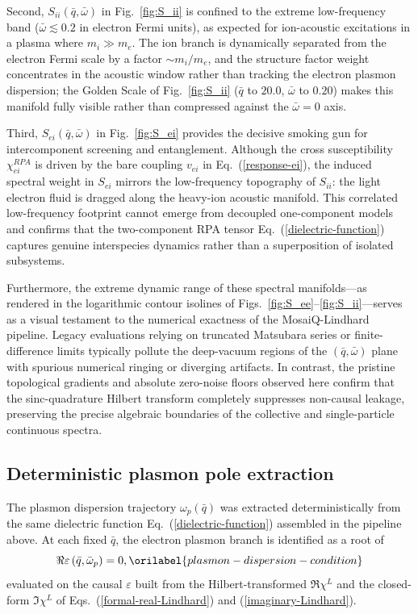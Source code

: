 \documentclass[aps,showkeys,noshowpacs,superscriptaddress,pre,preprint]{revtex4-2}
\let\label\orilabel
\begin{document}
Second, $S_{ii}(\bar{q}, \bar{\omega})$ in Fig.~\ref{fig:S_ii} is confined to the extreme low-frequency band ($\bar{\omega} \lesssim 0.2$ in electron Fermi units),
as expected for ion-acoustic excitations in a plasma where $m_i \gg m_e$.
The ion branch is dynamically separated from the electron Fermi scale by a factor $\sim m_i/m_e$,
and the structure factor weight concentrates in the acoustic window rather than tracking the electron plasmon dispersion; the Golden Scale of Fig.~\ref{fig:S_ii} ($\bar{q}$ to $20.0$, $\bar{\omega}$ to $0.20$) makes this manifold fully visible rather than compressed against the $\bar{\omega}=0$ axis.

Third, $S_{ei}(\bar{q}, \bar{\omega})$ in Fig.~\ref{fig:S_ei} provides the decisive smoking gun for intercomponent screening and entanglement.
Although the cross susceptibility $\chi^{RPA}_{ei}$ is driven by the bare coupling $v_{ei}$ in Eq.~(\ref{response-ei}),
the induced spectral weight in $S_{ei}$ mirrors the low-frequency topography of $S_{ii}$:
the light electron fluid is dragged along the heavy-ion acoustic manifold.
This correlated low-frequency footprint cannot emerge from decoupled one-component models
and confirms that the two-component RPA tensor Eq.~(\ref{dielectric-function}) captures
genuine interspecies dynamics rather than a superposition of isolated subsystems.

Furthermore, the extreme dynamic range of these spectral manifolds---as rendered in the logarithmic contour isolines of Figs.~\ref{fig:S_ee}--\ref{fig:S_ii}---serves as a visual testament to the numerical exactness of the MosaiQ-Lindhard pipeline. Legacy evaluations relying on truncated Matsubara series or finite-difference limits typically pollute the deep-vacuum regions of the $(\bar{q}, \bar{\omega})$ plane with spurious numerical ringing or diverging artifacts. In contrast, the pristine topological gradients and absolute zero-noise floors observed here confirm that the sinc-quadrature Hilbert transform completely suppresses non-causal leakage, preserving the precise algebraic boundaries of the collective and single-particle continuous spectra.

\subsection{Deterministic plasmon pole extraction}
\label{sec:plasmon-pole-extraction}

The plasmon dispersion trajectory $\omega_p(\bar{q})$ was extracted deterministically from the
same dielectric function Eq.~(\ref{dielectric-function}) assembled in the pipeline above.
At each fixed $\bar{q}$, the electron plasmon branch is identified as a root of
\begin{equation}
\Re \varepsilon \left( \bar{q}, \bar{\omega}_p \right) = 0 ,
\label{plasmon-dispersion-condition}
\end{equation}
evaluated on the causal $\varepsilon$ built from the Hilbert-transformed $\Re \chi^L$
and the closed-form $\Im \chi^L$ of Eqs.~(\ref{formal-real-Lindhard}) and (\ref{imaginary-Lindhard}).
\end{document}
